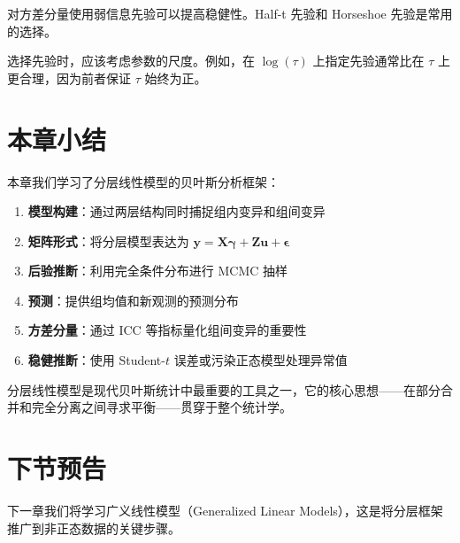 对方差分量使用弱信息先验可以提高稳健性。Half-t 先验和 Horseshoe 先验是常用的选择。

\begin{Remark}
选择先验时，应该考虑参数的尺度。例如，在 $\log(\tau)$ 上指定先验通常比在 $\tau$ 上更合理，因为前者保证 $\tau$ 始终为正。
\end{Remark}

\section{本章小结}
\label{sec:ch15-summary}

本章我们学习了分层线性模型的贝叶斯分析框架：

\begin{enumerate}
  \item \textbf{模型构建}：通过两层结构同时捕捉组内变异和组间变异
  \item \textbf{矩阵形式}：将分层模型表达为 $\mathbf{y} = \mathbf{X}\boldsymbol{\gamma} + \mathbf{Z}\mathbf{u} + \boldsymbol{\epsilon}$
  \item \textbf{后验推断}：利用完全条件分布进行 MCMC 抽样
  \item \textbf{预测}：提供组均值和新观测的预测分布
  \item \textbf{方差分量}：通过 ICC 等指标量化组间变异的重要性
  \item \textbf{稳健推断}：使用 Student-$t$ 误差或污染正态模型处理异常值
\end{enumerate}

分层线性模型是现代贝叶斯统计中最重要的工具之一，它的核心思想——在部分合并和完全分离之间寻求平衡——贯穿于整个统计学。

\section{下节预告}
\label{sec:ch15-next}

下一章我们将学习广义线性模型（Generalized Linear Models），这是将分层框架推广到非正态数据的关键步骤。

\endinput
